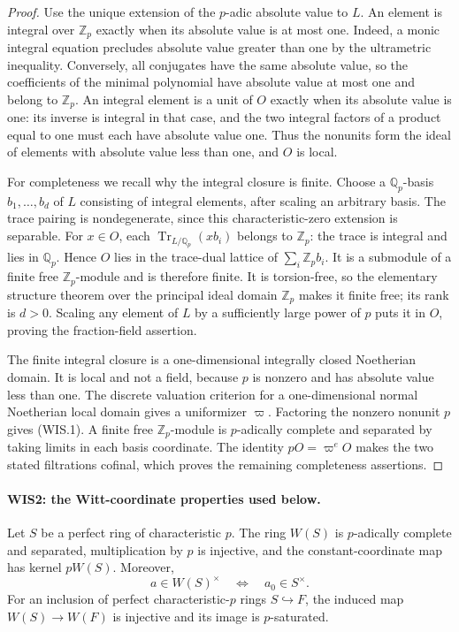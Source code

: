 \documentclass[11pt,a4paper]{article}
\numberwithin{equation}{section}
\theoremstyle{remark}\newtheorem{remark}[theorem]{Remark}
\begin{document}
\begin{proof}
Use the unique extension of the $p$-adic absolute value to $L$.
An element is integral over $\mathbb Z_p$ exactly when its absolute
value is at most one. Indeed, a monic integral equation precludes
absolute value greater than one by the ultrametric inequality.
Conversely, all conjugates have the same absolute value, so the
coefficients of the minimal polynomial have absolute value at most
one and belong to $\mathbb Z_p$. An integral element is a unit of
$O$ exactly when its absolute value is one: its inverse is integral
in that case, and the two integral factors of a product equal to
one must each have absolute value one. Thus the nonunits form
the ideal of elements with absolute value less than one, and $O$
is local.

For completeness we recall why the integral closure is finite.
Choose a $\mathbb Q_p$-basis $b_1,\ldots,b_d$ of $L$ consisting of
integral elements, after scaling an arbitrary basis. The trace
pairing is nondegenerate, since this characteristic-zero extension
is separable. For $x\in O$, each $\operatorname{Tr}_{L/\mathbb Q_p}
(xb_i)$ belongs to $\mathbb Z_p$: the trace is integral and lies
in $\mathbb Q_p$. Hence $O$ lies in the trace-dual lattice of
$\sum_i\mathbb Z_p b_i$. It is a submodule of a finite free
$\mathbb Z_p$-module and is therefore finite. It is torsion-free,
so the elementary structure theorem over the principal ideal
domain $\mathbb Z_p$ makes it finite free; its rank is $d>0$.
Scaling any element of $L$ by a sufficiently large power of $p$
puts it in $O$, proving the fraction-field assertion.

The finite integral closure is a one-dimensional integrally closed
Noetherian domain. It is local and not a field, because $p$ is
nonzero and has absolute value less than one. The discrete
valuation criterion for a one-dimensional normal Noetherian local
domain gives a uniformizer $\varpi$. Factoring the nonzero nonunit
$p$ gives (WIS.1). A finite free $\mathbb Z_p$-module is $p$-adically
complete and separated by taking limits in each basis coordinate.
The identity $pO=\varpi^eO$ makes the two stated filtrations cofinal,
which proves the remaining completeness assertions.
\end{proof}

\paragraph{WIS2: the Witt-coordinate properties used below.}
\label{claim:WIS2}
Let $S$ be a perfect ring of characteristic $p$. The ring $W(S)$
is $p$-adically complete and separated, multiplication by $p$ is
injective, and the constant-coordinate map has kernel $pW(S)$.
Moreover,
\[
       a\in W(S)^\times\quad\Longleftrightarrow\quad
                         a_0\in S^\times.                 \tag{WIS.2}
\]
For an inclusion of perfect characteristic-$p$ rings $S\hookrightarrow F$,
the induced map $W(S)\to W(F)$ is injective and its image is
$p$-saturated.
\end{document}
